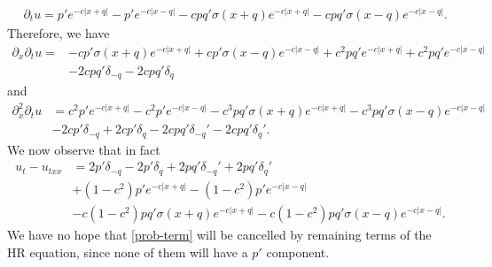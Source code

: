 \documentclass[12pt,reqno]{amsart}
\numberwithin{equation}{section}  %
\numberwithin{figure}{section}
\newcommand{\p}{\partial}
\theoremstyle{plain}  %
\theoremstyle{definition}
\begin{document}
%
\begin{align*}
  &\p_t u
  =
  p'e^{-c|x+q|} 
  - 
  p'e^{-c|x-q|}
  -
  cpq'\sigma(x+q)e^{-c|x+q|}
  -
  cpq'\sigma(x-q)e^{-c|x-q|}.
\end{align*}
%
Therefore, we have 
%
\begin{align*}
  \p_x\p_t u
  = 
  &-cp' \sigma(x+q) e^{-c|x+q|}
  +
  cp'\sigma(x-q)e^{-c|x-q|} 
  + 
  c^2pq'e^{-c|x+q|} 
  +
  c^2pq' e^{-c|x-q|}\\
  &-
  2cpq' \delta_{-q}
  -2cpq'\delta_q
\end{align*}
%
and 
%
\begin{align*}
  \p_x^2\p_t u
  &=
  c^2p'e^{-c|x+q|}
  -
  c^2p'e^{-c|x-q|}
  -
  c^3pq'\sigma(x+q)e^{-c|x+q|}
  -
  c^3pq'\sigma(x-q)e^{-c|x-q|} \\
  &-2cp' \delta_{-q} + 2cp'\delta_q - 2cpq'\delta_{-q}' - 2cpq'\delta_q'.
\end{align*}
%
We now observe that in fact
%
\begin{align}
  u_t - u_{txx} &= 2p' \delta_{-q} - 2p'\delta_q + 2pq'\delta_{-q}' + 2pq'\delta_q'
  \\
  \label{prob-term}
  & + (1-c^2)p'e^{-c| x+q |} - (1 -c^2)p'e^{-c| x-q |}
  \\
  & -c(1-c^{2})pq'\sigma(x+q)e^{-c| x+q |} - c(1-c^{2})pq' \sigma(x-q)e^{-c| x-q
  |}.
\end{align}
We have no hope that \eqref{prob-term} will be cancelled by remaining terms of
the HR equation, since none of them will have a $p'$ component.
%
%
%
%
%
%
%
%
%
\end{document}
